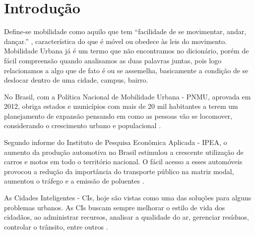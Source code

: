 %
%

\chapter{Introdução}\label{chap:introducao}  

Define-se mobilidade como aquilo que tem “facilidade de se movimentar, andar, dançar.” \cite{mobilidade}, característica do que é móvel ou obedece às leis do movimento. Mobilidade Urbana já é um termo que não encontramos no dicionário, porém de fácil compreensão quando analisamos as duas palavras juntas, pois logo relacionamos
a algo que de fato é ou se assemelha, basicamente a condição 
de se deslocar dentro de uma cidade, campus, bairro. %



No Brasil, com a Política Nacional de Mobilidade Urbana - PNMU, %
aprovada em 2012, obriga estados e municípios com mais de 20 mil habitantes a terem um planejamento de expansão pensando em como as pessoas vão se locomover, considerando o crescimento urbano e populacional  \cite{lei12587}. %

\begin{comment}
Alguns desses direitos é tornar as vias uma forma de liberdade aos cidadãos, garantir o direito de ir e vir, adaptar ruas, adaptar ciclovias, adaptar calçadas, adicionar novos meios de transporte, e etc. %
	conteúdo...
\end{comment}

Segundo informe do Instituto de Pesquisa Econômica Aplicada - IPEA, o aumento da produção automotiva no Brasil estimulou a crescente utilização de carros e motos em todo o território nacional. O fácil acesso a esses automóveis provocou a redução da importância do transporte público na matriz modal, aumentou o tráfego e a emissão de poluentes \cite{ipea}.

As Cidades Inteligentes - CIs, hoje são vistas como uma das soluções para alguns problemas urbanos. %
As CIs buscam sempre melhorar o estilo de vida dos cidadãos, ao administrar recursos, analisar a qualidade do ar, gerenciar resíduos, controlar o trânsito, entre outros \cite{chourabi}.

